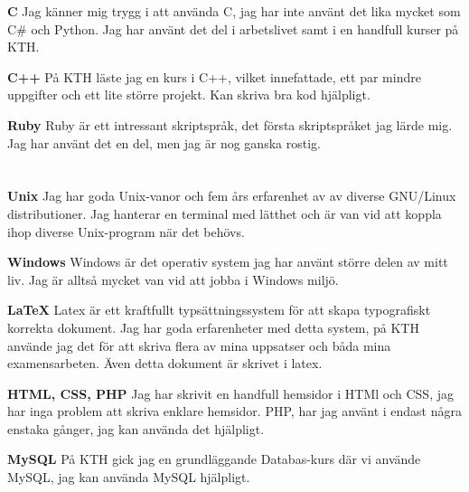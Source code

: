 \documentclass[margin,line]{resume}%
\begin{document}
\begin{resume}
		\textbf{C}\hspace{0.5cm}
		Jag känner mig trygg i att använda C, jag har inte använt det lika mycket som
		C\# och Python. Jag har använt det del i arbetslivet samt i en handfull kurser på KTH.

		\textbf{C++}\hspace{0.5cm}
		På KTH läste jag en kurs i C++, vilket innefattade, ett par mindre
		uppgifter och ett lite större projekt. Kan skriva bra kod hjälpligt.

		\textbf{Ruby}\hspace{0.5cm}
		Ruby är ett intressant skriptspråk, det första skriptspråket jag lärde
		mig. Jag har använt det en del, men jag är nog ganska rostig.

	   \section{}\vspace{0.001mm}

		\textbf{Unix}\hspace{0.5cm}
		Jag har goda Unix-vanor och fem års erfarenhet av av diverse GNU/Linux
		distributioner. Jag hanterar en terminal med lätthet och är van
		vid att koppla ihop diverse Unix-program när det behövs.

		\textbf{Windows}\hspace{0.5cm}
		Windows är det operativ system jag har använt större delen av mitt liv.
		Jag är alltså mycket van vid att jobba i Windows miljö.

		\textbf{\LaTeX}\hspace{0.5cm}
		Latex är ett kraftfullt typsättningssystem för att skapa typografiskt
		korrekta dokument. Jag har goda erfarenheter med detta system, på KTH
		använde jag det för att skriva flera av mina uppsatser och båda mina
		examensarbeten. Även detta dokument är skrivet i latex.

		\textbf{HTML, CSS, PHP}\hspace{0.5cm}
		Jag har skrivit en handfull hemsidor i HTMl och CSS, jag har inga
		problem att skriva enklare hemsidor. PHP, har jag använt i endast
		några enstaka gånger, jag kan använda det hjälpligt.

		\textbf{MySQL}\hspace{0.5cm}
		På KTH gick jag en grundläggande Databas-kurs där vi använde MySQL,
		jag kan använda MySQL hjälpligt.


\end{resume}
\end{document}
